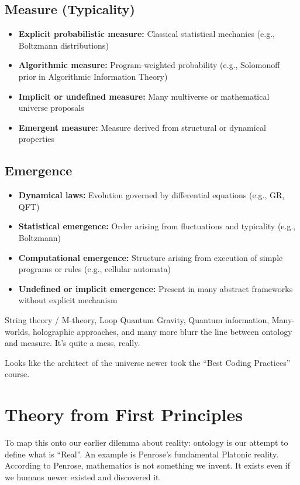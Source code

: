 \subsection*{Measure (Typicality)}
\begin{itemize}
    \item \textbf{Explicit probabilistic measure:} Classical statistical mechanics (e.g., Boltzmann distributions)
    \item \textbf{Algorithmic measure:} Program-weighted probability (e.g., Solomonoff prior in Algorithmic Information Theory)
    \item \textbf{Implicit or undefined measure:} Many multiverse or mathematical universe proposals
    \item \textbf{Emergent measure:} Measure derived from structural or dynamical properties
\end{itemize}

\subsection*{Emergence}
\begin{itemize}
    \item \textbf{Dynamical laws:} Evolution governed by differential equations (e.g., GR, QFT)
    \item \textbf{Statistical emergence:} Order arising from fluctuations and typicality (e.g., Boltzmann)
    \item \textbf{Computational emergence:} Structure arising from execution of simple programs or rules (e.g., cellular automata)
    \item \textbf{Undefined or implicit emergence:} Present in many abstract frameworks without explicit mechanism
\end{itemize}


String theory / M-theory, Loop Quantum Gravity, Quantum information, Many-worlds, holographic approaches, and many more 
blurr the line between ontology and measure. It's quite a mess, really.

Looks like the architect of the universe newer took the ``Best Coding Practices''  course.



\section{Theory from First Principles}

To map this onto our earlier dilemma about reality: ontology is our attempt to define what is ``Real''. An example is Penrose's fundamental Platonic reality.
According to Penrose, mathematics is not something we invent. It exists even if we humans newer existed and discovered it. 

